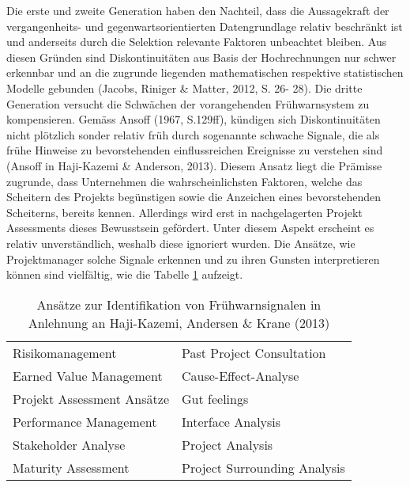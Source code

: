 Die erste und zweite Generation haben den Nachteil, dass die Aussagekraft der vergangenheits- und gegenwartsorientierten Datengrundlage relativ beschränkt ist und anderseits durch die Selektion relevante Faktoren unbeachtet bleiben. Aus diesen Gründen sind Diskontinuitäten aus Basis der Hochrechnungen nur schwer erkennbar und an die zugrunde liegenden mathematischen respektive statistischen Modelle gebunden   (Jacobs, Riniger \& Matter, 2012, S. 26- 28). Die dritte Generation versucht die Schwächen der vorangehenden Frühwarnsystem zu kompensieren. Gemäss Ansoff (1967, S.129ff), kündigen sich Diskontinuitäten nicht plötzlich sonder relativ früh durch sogenannte schwache Signale, die als frühe Hinweise zu bevorstehenden einflussreichen Ereignisse zu verstehen sind (Ansoff in Haji-Kazemi \& Anderson, 2013). Diesem Ansatz liegt die Prämisse zugrunde, dass Unternehmen die wahrscheinlichsten Faktoren, welche das Scheitern des Projekts begünstigen sowie die Anzeichen eines bevorstehenden Scheiterns, bereits kennen. Allerdings wird erst in nachgelagerten Projekt Assessments dieses Bewusstsein gefördert. Unter diesem Aspekt erscheint es relativ unverständlich, weshalb diese ignoriert wurden.
\newline
Die Ansätze, wie Projektmanager solche Signale erkennen und zu ihren Gunsten interpretieren können sind vielfältig, wie die Tabelle \ref{tab:Ans} aufzeigt.
\begin{table}[H]
	\centering
	\caption{Ansätze zur Identifikation von Frühwarnsignalen
		\newline in Anlehnung an Haji-Kazemi, Andersen \& Krane (2013)}\label{tab:Ans}	
	\begin{tabular}{l|l}
		Risikomanagement & Past Project Consultation\\
		Earned Value Management & Cause-Effect-Analyse\\
		Projekt Assessment Ansätze & Gut feelings \\
		Performance Management & Interface Analysis\\
		Stakeholder Analyse & Project Analysis \\
		Maturity Assessment & Project Surrounding Analysis\\
	\end{tabular}		
\end{table}

